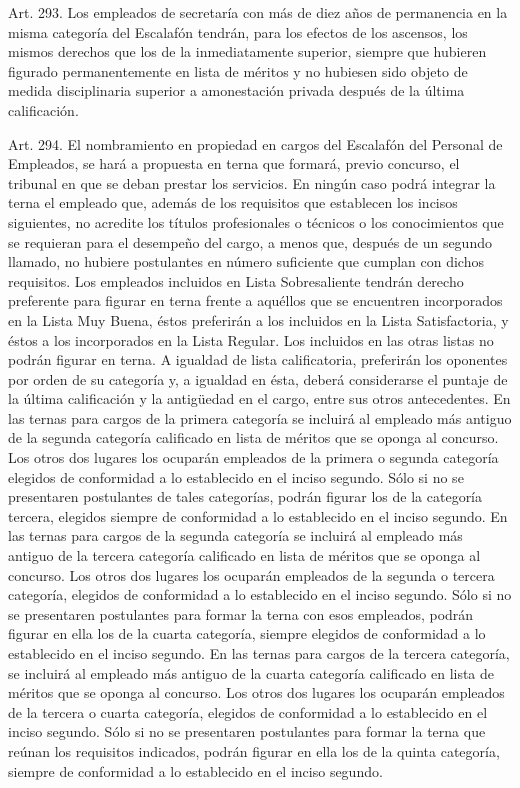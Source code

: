     Art. 293. Los empleados de secretaría con más de diez años de permanencia en la misma categoría del Escalafón tendrán, para los efectos de los ascensos, los mismos derechos que los de la inmediatamente superior, siempre que hubieren figurado permanentemente en lista de méritos y no hubiesen sido objeto de medida disciplinaria superior a amonestación privada después de la última calificación.

    Art. 294. El nombramiento en propiedad en cargos del Escalafón del Personal de Empleados, se hará a propuesta en terna que formará, previo concurso, el tribunal en que se deban prestar los servicios. En ningún caso podrá integrar la terna el empleado que, además de los requisitos que establecen los incisos siguientes, no acredite los títulos profesionales o técnicos o los conocimientos que se requieran para el desempeño del cargo, a menos que, después de un segundo llamado, no hubiere postulantes en número suficiente que cumplan con dichos requisitos.
    Los empleados incluidos en Lista Sobresaliente tendrán derecho preferente para figurar en terna frente a aquéllos que se encuentren incorporados en la Lista Muy Buena, éstos preferirán a los incluidos en la Lista Satisfactoria, y éstos a los incorporados en la Lista Regular. Los incluidos en las otras listas no podrán figurar en terna. A igualdad de lista calificatoria, preferirán los oponentes por orden de su categoría y, a igualdad en ésta, deberá considerarse el puntaje de la última calificación y la antigüedad en el cargo, entre sus otros antecedentes.
    En las ternas para cargos de la primera categoría se incluirá al empleado más antiguo de la segunda categoría calificado en lista de méritos que se oponga al concurso. Los otros dos lugares los ocuparán empleados de la primera o segunda categoría elegidos de conformidad a lo establecido en el inciso segundo. Sólo si no se presentaren postulantes de tales categorías, podrán figurar los de la categoría tercera, elegidos siempre de conformidad a lo establecido en el inciso segundo.
    En las ternas para cargos de la segunda categoría se incluirá al empleado más antiguo de la tercera categoría calificado en lista de méritos que se oponga al concurso. Los otros dos lugares los ocuparán empleados de la segunda o tercera categoría, elegidos de conformidad a lo establecido en el inciso segundo. Sólo si no se presentaren postulantes para formar la terna con esos empleados, podrán figurar en ella los de la cuarta categoría, siempre elegidos de conformidad a lo establecido en el inciso segundo.
    En las ternas para cargos de la tercera categoría, se incluirá al empleado más antiguo de la cuarta categoría calificado en lista de méritos que se oponga al concurso. Los otros dos lugares los ocuparán empleados de la tercera o cuarta categoría, elegidos de conformidad a lo establecido en el inciso segundo. Sólo si no se presentaren postulantes para formar la terna que reúnan los requisitos indicados, podrán figurar en ella los de la quinta categoría, siempre de conformidad a lo establecido en el inciso segundo.
